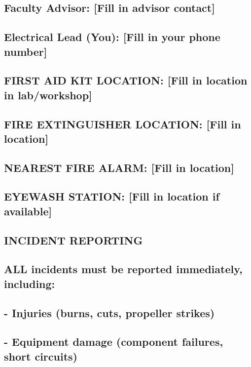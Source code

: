 \documentclass[11pt,letterpaper]{article}
\begin{document}
{{\subsection*{Faculty Advisor:                 [Fill in advisor contact]}

\subsection*{Electrical Lead (You):           [Fill in your phone number]}

\subsection*{FIRST AID KIT LOCATION:          [Fill in location in lab/workshop]}

\subsection*{FIRE EXTINGUISHER LOCATION:     [Fill in location]}

\subsection*{NEAREST FIRE ALARM:              [Fill in location]}

\subsection*{EYEWASH STATION:                 [Fill in location if available]}

\subsection*{INCIDENT REPORTING}

\subsection*{ALL incidents must be reported immediately, including:}

\subsection*{- Injuries (burns, cuts, propeller strikes)}

\subsection*{- Equipment damage (component failures, short circuits)}

}}
\end{document}
